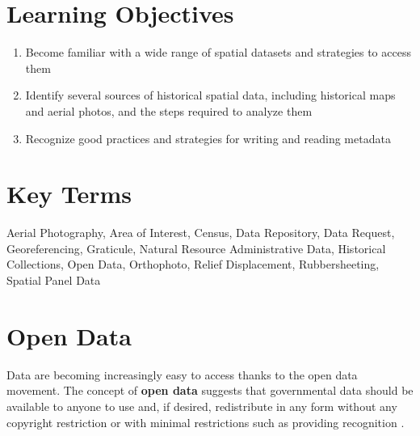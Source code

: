 \documentclass[
]{book}
\providecommand{\tightlist}{%
  \setlength{\itemsep}{0pt}\setlength{\parskip}{0pt}}
\begin{document}
\hypertarget{learning-objectives-3}{%
\section*{Learning Objectives}\label{learning-objectives-3}}

\begin{enumerate}
\def\labelenumi{\arabic{enumi}.}
\tightlist
\item
  Become familiar with a wide range of spatial datasets and strategies to access them
\item
  Identify several sources of historical spatial data, including historical maps and aerial photos, and the steps required to analyze them
\item
  Recognize good practices and strategies for writing and reading metadata
\end{enumerate}

\hypertarget{key-terms-3}{%
\section*{Key Terms}\label{key-terms-3}}

Aerial Photography, Area of Interest, Census, Data Repository, Data Request, Georeferencing, Graticule, Natural Resource Administrative Data, Historical Collections, Open Data, Orthophoto, Relief Displacement, Rubbersheeting, Spatial Panel Data

\hypertarget{open-data}{%
\section{Open Data}\label{open-data}}

Data are becoming increasingly easy to access thanks to the open data movement. The concept of \textbf{open data} suggests that governmental data should be available to anyone to use and, if desired, redistribute in any form without any copyright restriction or with minimal restrictions such as providing recognition \citep{kassen_promising_2013}.
\end{document}
